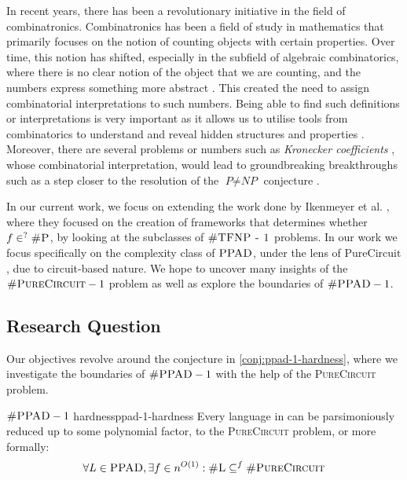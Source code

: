 In recent years, there has been a revolutionary
initiative in the field of combinatronics.
Combinatronics has been a field of study in mathematics that primarily focuses on
the notion of counting objects with certain properties. Over time, this notion
has shifted, especially in the subfield of algebraic combinatorics, where
there is no clear notion of the object that we are counting,
and the numbers express something more abstract \cite{pak_WhatCombinatorialInterpretation_2022}.
This created the need to assign combinatorial interpretations to such numbers.
Being able to find such definitions or interpretations is very important
as it allows us to utilise tools from combinatorics to understand
and reveal hidden structures and properties \cite{pak_WhatCombinatorialInterpretation_2022}. 
Moreover, there are several problems or numbers such as \textit{Kronecker coefficients} \cite{makar_AnalysisKroneckerProduct_1949},
whose combinatorial interpretation, would lead to groundbreaking breakthroughs such as a step closer to the resolution of the $\textit{P} \neq \textit{NP}$
conjecture \cite{ikenmeyer_WhatWhatNot_2022, ikenmeyer_VanishingKroneckerCoefficients_2017}.


In our current work, we focus on extending the work done by
Ikenmeyer et al. \cite{ikenmeyer_WhatWhatNot_2022}, where they focused on the creation of frameworks
that determines whether $f \in^? \textsc{\#P}$, by looking
at the subclasses of $\textsc{\#TFNP - 1}$ problems.
In our work we focus specifically on the complexity class of $\textsc{PPAD}$, under the lens of $\text{PureCircuit}$,
due to circuit-based nature.
We hope to uncover many insights of the $\textsc{\#PureCircuit} -1$ problem 
as well as explore the boundaries of $\textsc{\#PPAD} -1$.


\subsection{Research Question}

Our objectives revolve around the conjecture in \ref{conj:ppad-1-hardness}, where
we investigate the boundaries of $\textnormal{\textsc{\#PPAD}}-1$ with the help of the \textsc{PureCircuit} problem.
\begin{conjecturebox}{$\textnormal{\textsc{\#PPAD}}-1$ hardness}{ppad-1-hardness}
    Every language in  can be parsimoniously reduced up to some polynomial factor, to the
    \textsc{PureCircuit} problem, or more formally:
    $$
    \forall L \in \textnormal{\textsc{PPAD}}, \exists f \in n^{O(1)}: 
    \textnormal{\textsc{\#L}} \subseteq^f \textnormal{\textsc{\#PureCircuit}}
    $$
\end{conjecturebox}




